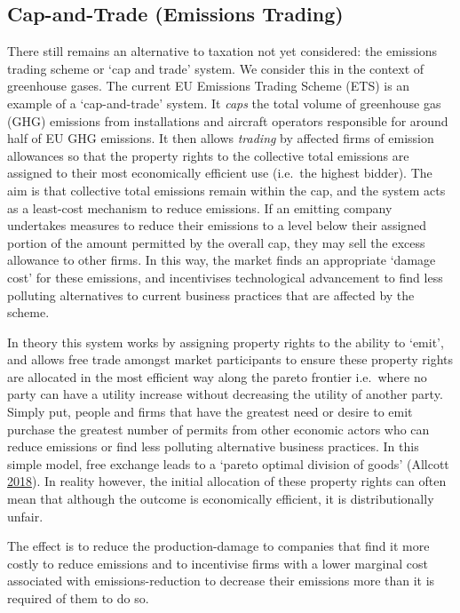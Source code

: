 \documentclass[]{tufte-handout}
\begin{document}
\hypertarget{cap-and-trade-emissions-trading}{%
\subsection{Cap-and-Trade (Emissions
Trading)}\label{cap-and-trade-emissions-trading}}

There still remains an alternative to taxation not yet considered: the
emissions trading scheme or `cap and trade' system. We consider this in
the context of greenhouse gases. The current EU Emissions Trading Scheme
(ETS) is an example of a `cap-and-trade' system. It \emph{caps} the
total volume of greenhouse gas (GHG) emissions from installations and
aircraft operators responsible for around half of EU GHG emissions. It
then allows \emph{trading} by affected firms of emission allowances so
that the property rights to the collective total emissions are assigned
to their most economically efficient use (i.e.~the highest bidder). The
aim is that collective total emissions remain within the cap, and the
system acts as a least-cost mechanism to reduce emissions. If an
emitting company undertakes measures to reduce their emissions to a
level below their assigned portion of the amount permitted by the
overall cap, they may sell the excess allowance to other firms. In this
way, the market finds an appropriate `damage cost' for these emissions,
and incentivises technological advancement to find less polluting
alternatives to current business practices that are affected by the
scheme.

In theory this system works by assigning property rights to the ability
to `emit', and allows free trade amongst market participants to ensure
these property rights are allocated in the most efficient way along the
pareto frontier i.e.~where no party can have a utility increase without
decreasing the utility of another party. Simply put, people and firms
that have the greatest need or desire to emit purchase the greatest
number of permits from other economic actors who can reduce emissions or
find less polluting alternative business practices. In this simple
model, free exchange leads to a `pareto optimal division of goods'
(Allcott \protect\hyperlink{ref-Allcott2018}{2018}). In reality however,
the initial allocation of these property rights can often mean that
although the outcome is economically efficient, it is distributionally
unfair.

The effect is to reduce the production-damage to companies that find it
more costly to reduce emissions and to incentivise firms with a lower
marginal cost associated with emissions-reduction to decrease their
emissions more than it is required of them to do so.
\end{document}
